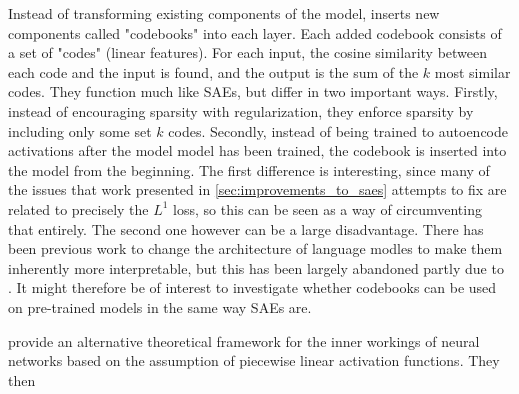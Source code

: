 Instead of transforming existing components of the model, \cite{tamkin_codebook_2023} inserts new components called "codebooks" into each layer.
Each added codebook consists of a set of "codes" (linear features).
For each input, the cosine similarity between each code and the input is found, and the output is the sum of the $k$ most similar codes. 
They function much like SAEs, but differ in two important ways.
Firstly, instead of encouraging sparsity with regularization, they enforce sparsity by including only some set $k$ codes.
Secondly, instead of being trained to autoencode activations after the model model has been trained, the codebook is inserted into the model from the beginning.
The first difference is interesting, since many of the issues that work presented in \ref{sec:improvements_to_saes} attempts to fix are related to precisely the $L^1$ loss, so this can be seen as a way of circumventing that entirely.
The second one however can be a large disadvantage.
There has been previous work \cite{elhage_softmax_2022} to change the architecture of language modles to make them inherently more interpretable, but this has been largely abandoned partly due to .
It might therefore be of interest to investigate whether codebooks can be used on pre-trained models in the same way SAEs are.


\cite{black_interpreting_2022} provide an alternative theoretical framework for the inner workings of neural networks based on the assumption of piecewise linear activation functions.
They then 
